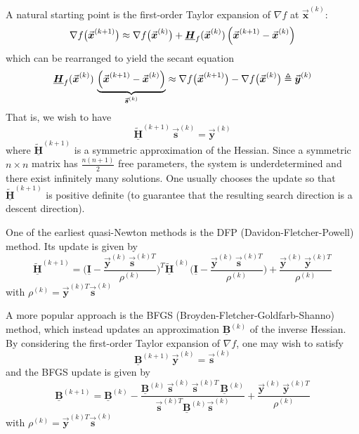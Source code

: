 \documentclass[9pt, headings=standardclasses, parskip=half]{scrartcl}
\renewcommand{\emph}[1]{\textcolor{mypurple}{#1}}
\newcommand{\matr}[1]{\underline{\boldsymbol{#1}}}
\newcommand{\vect}[1]{\vec{\boldsymbol{#1}}}
\begin{document}
A natural starting point is the first-order Taylor expansion of \(\nabla f\) at \(\vect{x}^{(k)}\):
\[
\nabla f\bigl(\vect{x}^{(k+1)}\bigr) \approx \nabla f\bigl(\vect{x}^{(k)}\bigr) + \matr{H}_{f}(\vect{x}^{(k)})\,\Bigl(\vect{x}^{(k+1)} - \vect{x}^{(k)}\Bigr) %
\]
which can be rearranged to yield the \emph{secant equation}
\[
\matr{H}_{f}(\vect{x}^{(k)})\, \underbrace{\Bigl(\vect{x}^{(k+1)} - \vect{x}^{(k)}\Bigr)}_{\vect{s}^{(k)}} \approx \nabla f\bigl(\vect{x}^{(k+1)}\bigr) - \nabla f\bigl(\vect{x}^{(k)}\bigr) \triangleq \vect{y}^{(k)} %
\]
That is, we wish to have
\[
\tilde{\matr{H}}^{(k+1)}\, \vect{s}^{(k)} = \vect{y}^{(k)} %
\]
where \(\tilde{\matr{H}}^{(k+1)}\) is a symmetric approximation of the Hessian. Since a symmetric \(n \times n\) matrix has \(\frac{n(n+1)}{2}\) free parameters, the system is underdetermined and there exist infinitely many solutions. One usually chooses the update so that \(\tilde{\matr{H}}^{(k+1)}\) is positive definite (to guarantee that the resulting search direction is a descent direction).

One of the earliest quasi-Newton methods is the DFP (Davidon-Fletcher-Powell) method. Its update is given by
\[
\tilde{\matr{H}}^{(k+1)} = \Biggl(\matr{I} - \frac{\vect{y}^{(k)}\, \vect{s}^{(k)T}}{\rho^{(k)}}\Biggr)^T \tilde{\matr{H}}^{(k)} \Biggl(\matr{I} - \frac{\vect{y}^{(k)}\, \vect{s}^{(k)T}}{\rho^{(k)}}\Biggr) + \frac{\vect{y}^{(k)}\,\vect{y}^{(k)T}}{\rho^{(k)}} %
\]
with
\(
\rho^{(k)} = \vect{y}^{(k)T} \vect{s}^{(k)} %
\)

A more popular approach is the BFGS (Broyden-Fletcher-Goldfarb-Shanno) method, which instead updates an approximation \(\matr{B}^{(k)}\) of the inverse Hessian. By considering the first-order Taylor expansion of \(\nabla f\), one may wish to satisfy
\[
\matr{B}^{(k+1)}\, \vect{y}^{(k)} = \vect{s}^{(k)} %
\]
and the BFGS update is given by
\[
\matr{B}^{(k+1)} = \matr{B}^{(k)} - \frac{\matr{B}^{(k)}\, \vect{s}^{(k)}\, \vect{s}^{(k)T}\, \matr{B}^{(k)}}{\vect{s}^{(k)T}\matr{B}^{(k)}\vect{s}^{(k)}} + \frac{\vect{y}^{(k)}\, \vect{y}^{(k)T}}{\rho^{(k)}} %
\]
with
\(
\rho^{(k)} = \vect{y}^{(k)T} \vect{s}^{(k)} %
\)
\end{document}
